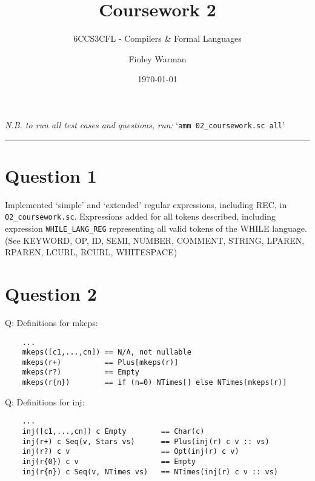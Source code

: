 \documentclass[english]{scrartcl}
\begin{document}


\subtitle{6CCS3CFL - Compilers \& Formal Languages}
\title{Coursework 2}
\author{Finley Warman}
\date{\today}

\maketitle

\begin{center}
    \textit{N.B. to run all test cases and questions, run:} `\verb|amm 02_coursework.sc all|'
\end{center}


\tableofcontents
\par\noindent\rule{\textwidth}{0.4pt}



\newpage

\section*{Question 1}
Implemented `simple' and `extended' regular expressions, including REC, in \verb~02_coursework.sc~.
Expressions added for all tokens described, including expression \verb~WHILE_LANG_REG~ representing all valid tokens
of the WHILE language.\\
(See KEYWORD, OP, ID, SEMI, NUMBER, COMMENT, STRING, LPAREN, RPAREN, LCURL, RCURL, WHITESPACE)

\section*{Question 2}
Q: Definitions for mkeps:
\begin{verbatim}
    ...
    mkeps([c1,...,cn]) == N/A, not nullable
    mkeps(r+)          == Plus[mkeps(r)]
    mkeps(r?)          == Empty
    mkeps(r{n})        == if (n=0) NTimes[] else NTimes[mkeps(r)]
\end{verbatim}


Q: Definitions for inj:
\begin{verbatim}
    ...
    inj([c1,...,cn]) c Empty        == Char(c)
    inj(r+) c Seq(v, Stars vs)      == Plus(inj(r) c v :: vs)
    inj(r?) c v                     == Opt(inj(r) c v)
    inj(r{0}) c v                   == Empty
    inj(r{n}) c Seq(v, NTimes vs)   == NTimes(inj(r) c v :: vs)
\end{verbatim}
\end{document}
